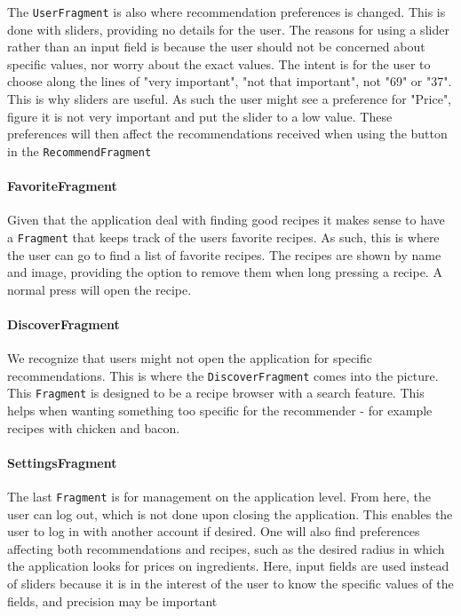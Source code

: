 The \texttt{UserFragment} is also where recommendation preferences is changed. This is done with sliders, providing no details for the user. The reasons for using a slider rather than an input field is because the user should not be concerned about specific values, nor worry about the exact values. The intent is for the user to choose along the lines of "very important", "not that important", not "69" or "37". This is why sliders are useful. As such the user might see a preference for "Price", figure it is not very important and put the slider to a low value. These preferences will then affect the recommendations received when using the button in the \texttt{RecommendFragment}

\paragraph{FavoriteFragment}
Given that the application deal with finding good recipes it makes sense to have a \texttt{Fragment} that keeps track of the users favorite recipes. As such, this is where the user can go to find a list of favorite recipes. The recipes are shown by name and image, providing the option to remove them when long pressing a recipe. A normal press will open the recipe.

\paragraph{DiscoverFragment}
We recognize that users might not open the application for specific recommendations. This is where the \texttt{DiscoverFragment} comes into the picture. This \texttt{Fragment} is designed to be a recipe browser with a search feature. This helps when wanting something too specific for the recommender - for example recipes with chicken and bacon.

\paragraph{SettingsFragment}
The last \texttt{Fragment} is for management on the application level. From here, the user can log out, which is not done upon closing the application. This enables the user to log in with another account if desired. One will also find preferences affecting both recommendations and recipes, such as the desired radius in which the application looks for prices on ingredients. Here, input fields are used instead of sliders because it is in the interest of the user to know the specific values of the fields, and precision may be important

